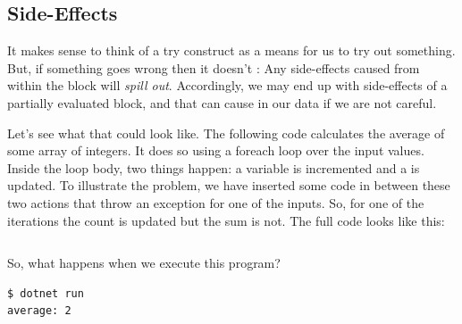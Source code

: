 \subsection{Side-Effects}

It makes sense to think of a try construct as a means for us to try out something. But, if something goes wrong then it doesn't : Any side-effects caused from within the  block will \textsl{spill out}. Accordingly, we may end up with side-effects of a partially evaluated  block, and that can cause  in our data if we are not careful.

Let's see what that could look like. The following code calculates the average of some array of integers. It does so using a foreach loop over the input values. Inside the loop body, two things happen: a  variable is incremented and a  is updated. To illustrate the problem, we have inserted some code in between these two actions that throw an exception for one of the inputs. So, for one of the iterations the count is updated but the sum is not. The full code looks like this:

\inputminted[firstline=1]{csharp}{../src/csharp/exceptions/sideeffects/Program.cs}

So, what happens when we execute this program?

\begin{verbatim}
$ dotnet run
average: 2
\end{verbatim}

